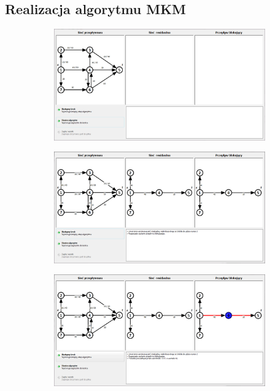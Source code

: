 \begin{appendices}
 	\chapter{Realizacja algorytmu MKM}\label{add:mkmExample}
 	\setlength\intextsep{10pt}
 	\begin{figure}[H]
 		\centering
 		\begin{subfigure}{\textwidth}
 			\includegraphics[width=0.9\linewidth]{./img/mkm01.jpg}
 		\end{subfigure}\par\bigskip
 		\begin{subfigure}{\textwidth}
 			\includegraphics[width=0.9\linewidth]{./img/mkm02.jpg}
 		\end{subfigure}
 	\end{figure}
 	\begin{figure}
 		\ContinuedFloat
 		\begin{subfigure}{\textwidth}
 			\includegraphics[width=0.9\linewidth]{./img/mkm03.jpg}

\end{subfigure}
\end{figure}
\end{appendices}
